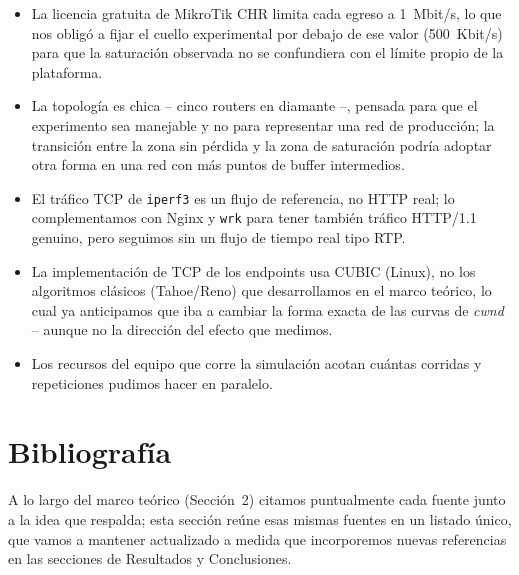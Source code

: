 \documentclass[11pt,a4paper]{article}
\begin{document}
\begin{itemize}
  \item La licencia gratuita de MikroTik CHR limita cada egreso a 1~Mbit/s, lo que nos oblig\'o a fijar el cuello experimental por debajo de ese valor (500~Kbit/s) para que la saturaci\'on observada no se confundiera con el l\'imite propio de la plataforma.
  \item La topolog\'ia es chica -- cinco routers en diamante --, pensada para que el experimento sea manejable y no para representar una red de producci\'on; la transici\'on entre la zona sin p\'erdida y la zona de saturaci\'on podr\'ia adoptar otra forma en una red con m\'as puntos de buffer intermedios.
  \item El tr\'afico TCP de \texttt{iperf3} es un flujo de referencia, no HTTP real; lo complementamos con Nginx y \texttt{wrk} para tener tambi\'en tr\'afico HTTP/1.1 genuino, pero seguimos sin un flujo de tiempo real tipo RTP.
  \item La implementaci\'on de TCP de los endpoints usa CUBIC (Linux), no los algoritmos cl\'asicos (Tahoe/Reno) que desarrollamos en el marco te\'orico, lo cual ya anticipamos que iba a cambiar la forma exacta de las curvas de \textit{cwnd} -- aunque no la direcci\'on del efecto que medimos.
  \item Los recursos del equipo que corre la simulaci\'on acotan cu\'antas corridas y repeticiones pudimos hacer en paralelo.
\end{itemize}

\clearpage
\section*{Bibliograf\'ia}
\label{sec:bibliografia}

A lo largo del marco te\'orico (Secci\'on~2) citamos puntualmente cada fuente junto a la idea que respalda; esta secci\'on re\'une esas mismas fuentes en un listado \'unico, que vamos a mantener actualizado a medida que incorporemos nuevas referencias en las secciones de Resultados y Conclusiones.
\end{document}
